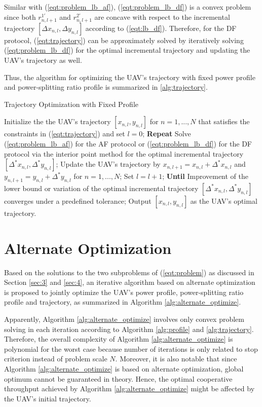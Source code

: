 \documentclass[12pt, draftclsnofoot, onecolumn]{IEEEtran}
\begin{document}
Similar with (\ref{eqt:problem_lb_af}), (\ref{eqt:problem_lb_df}) is a convex problem since both $r^{1\prime}_{n,l+1}$ and $r^{2\prime}_{n,l+1}$ are concave with respect to the incremental trajectory $[\Delta x_{n,l},\Delta y_{n,l}]$ according to (\ref{eqt:lb_df}). Therefore, for the DF protocol, (\ref{eqt:trajectory}) can be approximately solved by iteratively solving (\ref{eqt:problem_lb_df}) for the optimal incremental trajectory and updating the UAV's trajectory as well.

Thus, the algorithm for optimizing the UAV's trajectory with fixed power profile and power-splitting ratio profile is summarized in \ref{alg:trajectory}.

\begin{algorithm}[htb] 
\caption{Trajectory Optimization with Fixed Profile}\label{alg:trajectory}
\begin{algorithmic}[1]
\STATE Initialize the the UAV's trajectory $[x_{n,l},y_{n,l}]$ for $n=1,...,N$ that satisfies the constraints in (\ref{eqt:trajectory}) and set $l=0$;
\STATE \textbf{Repeat}
\STATE \quad Solve (\ref{eqt:problem_lb_af}) for the AF protocol or (\ref{eqt:problem_lb_df}) for the DF protocol via the interior point method for the optimal incremental trajectory $[\Delta^{*}x_{n,l},\Delta^{*}y_{n,l}]$;
\STATE \quad Update the UAV's trajectory by $x_{n,l+1}=x_{n,l}+\Delta^{*}x_{n,l}$ and $y_{n,l+1}=y_{n,l}+\Delta^{*}y_{n,l}$ for $n=1,...,N$;
\STATE \quad Set $l=l+1$;
\STATE \textbf{Until} Improvement of the lower bound or variation of the optimal incremental trajectory  $[\Delta^{*}x_{n,l},\Delta^{*}y_{n,l}]$ converges under a predefined tolerance;
\STATE Output $[x_{n,l},y_{n,l}]$ as the UAV's optimal trajectory.
\end{algorithmic}
\end{algorithm}

\section{Alternate Optimization}
Based on the solutions to the two subproblems of (\ref{eqt:problem}) as discussed in Section \ref{sec:3} and \ref{sec:4}, an iterative algorithm based on alternate optimization is proposed to jointly optimize the UAV's power profile, power-splitting ratio profile and trajectory, as summarized in Algorithm \ref{alg:alternate_optimize}.

Apparently, Algorithm \ref{alg:alternate_optimize} involves only convex problem solving in each iteration according to Algorithm \ref{alg:profile} and \ref{alg:trajectory}. Therefore, the overall complexity of Algorithm \ref{alg:alternate_optimize} is polynomial for the worst case because number of iterations is only related to stop criterion instead of problem scale $N$. Moreover, it is also notable that since Algorithm \ref{alg:alternate_optimize} is based on alternate optimization, global optimum cannot be guaranteed in theory. Hence, the optimal cooperative throughput achieved by Algorithm \ref{alg:alternate_optimize} might be affected by the UAV's initial trajectory.
\end{document}
